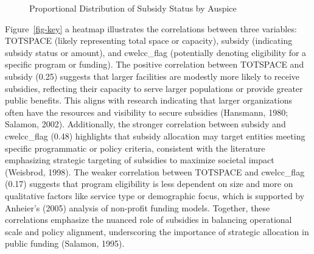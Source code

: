 \documentclass[
  letterpaper,
  DIV=11,
  numbers=noendperiod]{scrartcl}
\begin{document}
\begin{figure}


\caption{\label{fig-relationAuspice}Proportional Distribution of Subsidy
Status by Auspice}

\end{figure}%

Figure~\ref{fig-key} a heatmap illustrates the correlations between
three variables: TOTSPACE (likely representing total space or capacity),
subsidy (indicating subsidy status or amount), and cwelcc\_flag
(potentially denoting eligibility for a specific program or funding).
The positive correlation between TOTSPACE and subsidy (0.25) suggests
that larger facilities are modestly more likely to receive subsidies,
reflecting their capacity to serve larger populations or provide greater
public benefits. This aligns with research indicating that larger
organizations often have the resources and visibility to secure
subsidies (Hansmann, 1980; Salamon, 2002). Additionally, the stronger
correlation between subsidy and cwelcc\_flag (0.48) highlights that
subsidy allocation may target entities meeting specific programmatic or
policy criteria, consistent with the literature emphasizing strategic
targeting of subsidies to maximize societal impact (Weisbrod, 1998). The
weaker correlation between TOTSPACE and cwelcc\_flag (0.17) suggests
that program eligibility is less dependent on size and more on
qualitative factors like service type or demographic focus, which is
supported by Anheier's (2005) analysis of non-profit funding models.
Together, these correlations emphasize the nuanced role of subsidies in
balancing operational scale and policy alignment, underscoring the
importance of strategic allocation in public funding (Salamon, 1995).
\end{document}
